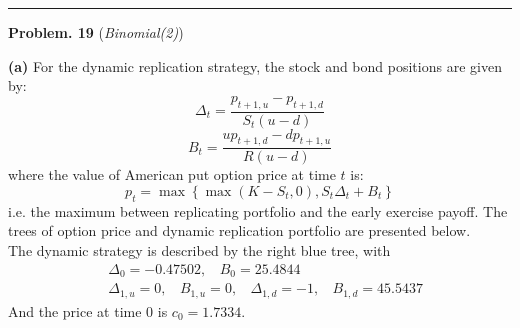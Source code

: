 \documentclass[10 pt]{hwtemplate} %
\begin{document}
\noindent\rule{16cm}{0.4pt}
\textbf{Problem. 19} (\textit{Binomial(2)})\\
\begin{solution} \textbf{(a)} For the dynamic replication strategy, the stock and bond positions are given by:
\begin{equation}
  \Delta_t = \frac{p_{t+1,u} - p_{t+1, d}}{S_t(u-d)}
\end{equation}
\begin{equation}
  B_t = \frac{up_{t+1,d} - dp_{t+1, u}}{R(u-d)}
\end{equation}
where the value of American put option price at time $t$ is:
\begin{equation}
  p_t = \max\left\{\max(K-S_t, 0), S_t\Delta_t + B_t\right\}
\end{equation}
i.e. the maximum between replicating portfolio and the early exercise payoff. The trees of option price and dynamic replication portfolio are presented below. \\
The dynamic strategy is described by the right blue tree, with
\begin{equation}
  \begin{split}
    &\Delta_0 = -0.47502,~~~~B_0 = 25.4844\\
    &\Delta_{1,u} = 0,~~~~B_{1,u} = 0,~~~~\Delta_{1,d} = -1,~~~~B_{1,d} = 45.5437
  \end{split}
\end{equation}
And the price at time 0 is $c_0 = 1.7334$.\\


\end{solution}
\end{document}

